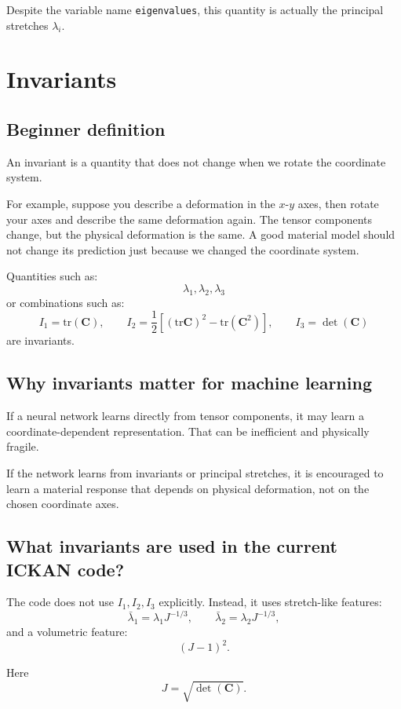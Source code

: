 \documentclass[11pt]{article}
\newcommand{\C}{\bm{C}}
\begin{document}
Despite the variable name \texttt{eigenvalues}, this quantity is actually the
principal stretches $\lambda_i$.

\section{Invariants}

\subsection{Beginner definition}

An invariant is a quantity that does not change when we rotate the coordinate
system.

For example, suppose you describe a deformation in the $x$-$y$ axes, then rotate
your axes and describe the same deformation again. The tensor components change,
but the physical deformation is the same. A good material model should not
change its prediction just because we changed the coordinate system.

Quantities such as:
\[
  \lambda_1,\lambda_2,\lambda_3
\]
or combinations such as:
\[
  I_1 = \mathrm{tr}(\C),
  \qquad
  I_2 = \frac{1}{2}\left[(\mathrm{tr}\C)^2-\mathrm{tr}(\C^2)\right],
  \qquad
  I_3 = \det(\C)
\]
are invariants.

\subsection{Why invariants matter for machine learning}

If a neural network learns directly from tensor components, it may learn a
coordinate-dependent representation. That can be inefficient and physically
fragile.

If the network learns from invariants or principal stretches, it is encouraged
to learn a material response that depends on physical deformation, not on the
chosen coordinate axes.

\subsection{What invariants are used in the current ICKAN code?}

The code does not use $I_1,I_2,I_3$ explicitly. Instead, it uses stretch-like
features:
\[
  \bar{\lambda}_1 = \lambda_1 J^{-1/3},
  \qquad
  \bar{\lambda}_2 = \lambda_2 J^{-1/3},
\]
and a volumetric feature:
\[
  (J-1)^2.
\]

Here
\[
  J = \sqrt{\det(\C)}.
\]
\end{document}
